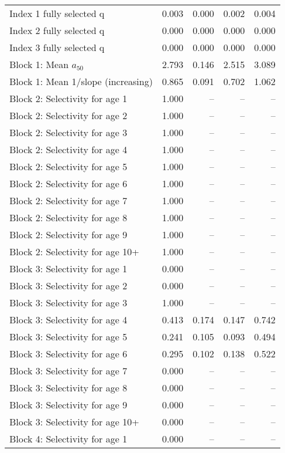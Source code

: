 \documentclass[
]{article}
\begin{document}
\begin{landscape}
\begin{longtable}[t]{lrrrr}
\endfoot
\bottomrule
\endlastfoot
Index 1 fully selected q & 0.003 & 0.000 & 0.002 & 0.004\\
Index 2 fully selected q & 0.000 & 0.000 & 0.000 & 0.000\\
Index 3 fully selected q & 0.000 & 0.000 & 0.000 & 0.000\\
Block 1: Mean $a_{50}$ & 2.793 & 0.146 & 2.515 & 3.089\\
Block 1: Mean 1/slope (increasing) & 0.865 & 0.091 & 0.702 & 1.062\\
\addlinespace
Block 2: Selectivity for age 1 & 1.000 & -- & -- & --\\
Block 2: Selectivity for age 2 & 1.000 & -- & -- & --\\
Block 2: Selectivity for age 3 & 1.000 & -- & -- & --\\
Block 2: Selectivity for age 4 & 1.000 & -- & -- & --\\
Block 2: Selectivity for age 5 & 1.000 & -- & -- & --\\
\addlinespace
Block 2: Selectivity for age 6 & 1.000 & -- & -- & --\\
Block 2: Selectivity for age 7 & 1.000 & -- & -- & --\\
Block 2: Selectivity for age 8 & 1.000 & -- & -- & --\\
Block 2: Selectivity for age 9 & 1.000 & -- & -- & --\\
Block 2: Selectivity for age 10+ & 1.000 & -- & -- & --\\
\addlinespace
Block 3: Selectivity for age 1 & 0.000 & -- & -- & --\\
Block 3: Selectivity for age 2 & 0.000 & -- & -- & --\\
Block 3: Selectivity for age 3 & 1.000 & -- & -- & --\\
Block 3: Selectivity for age 4 & 0.413 & 0.174 & 0.147 & 0.742\\
Block 3: Selectivity for age 5 & 0.241 & 0.105 & 0.093 & 0.494\\
\addlinespace
Block 3: Selectivity for age 6 & 0.295 & 0.102 & 0.138 & 0.522\\
Block 3: Selectivity for age 7 & 0.000 & -- & -- & --\\
Block 3: Selectivity for age 8 & 0.000 & -- & -- & --\\
Block 3: Selectivity for age 9 & 0.000 & -- & -- & --\\
Block 3: Selectivity for age 10+ & 0.000 & -- & -- & --\\
\addlinespace
Block 4: Selectivity for age 1 & 0.000 & -- & -- & --\\

\end{longtable}
\end{landscape}
\end{document}
